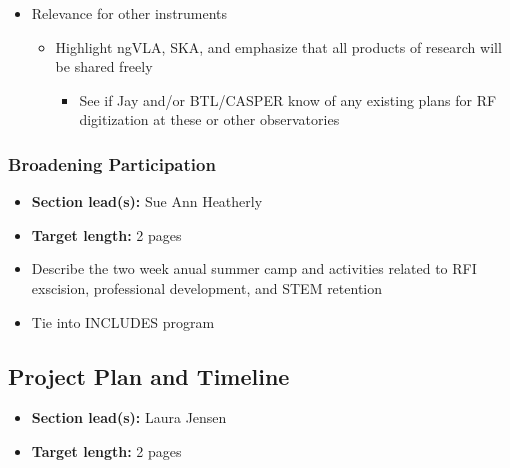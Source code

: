 \documentclass[10pt]{NSF}
\begin{document}
\begin{itemize}
\begin{itemize}
\begin{itemize}
{        of RFI (w/ input from IPG)}
    \end{itemize}
  \item{Provide greater resistance to RFI through increased bit depth
      and by minimizing analog components}
  \item{Improve reliability and reduce operational complexity by
      minimizing components in signal path}
  \item{Update IF system with state-of-the-art technology}
  \item{Create a model for fast, modular upgrades as new technology
      emerges}
  \end{itemize}
\item{Relevance for other instruments}
  \begin{itemize}
  \item{Highlight ngVLA, SKA, and emphasize that all products of
      research will be shared freely}
    \begin{itemize}
    \item{See if Jay and/or BTL/CASPER know of any existing plans for
        RF digitization at these or other observatories}
    \end{itemize}
  \end{itemize}
\end{itemize}

\subsubsection{Broadening Participation}
\label{sec:participation}

\begin{itemize}
\item{\textbf{Section lead(s):} Sue Ann Heatherly}
\item{\textbf{Target length:} 2 pages}
\item{Describe the two week anual summer camp and activities related
  to RFI exscision, professional development, and STEM retention}
\item{Tie into INCLUDES program}
\end{itemize}

\subsection{Project Plan and Timeline}
\label{sec:plan}

\begin{itemize}
\item{\textbf{Section lead(s):} Laura Jensen}
\item{\textbf{Target length:} 2 pages}
\end{itemize}
\end{document}
